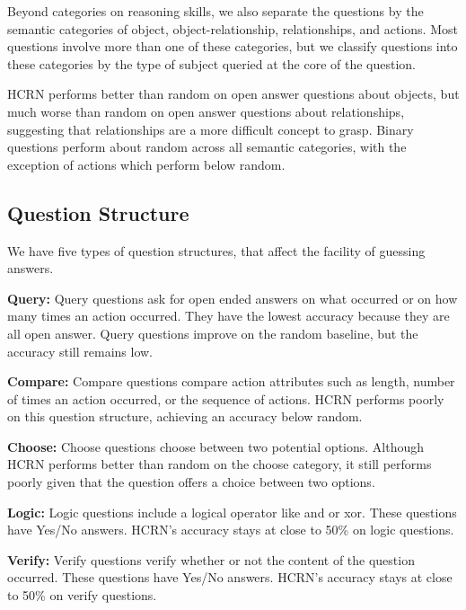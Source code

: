 \documentclass[10pt,twocolumn,letterpaper]{article}
\begin{document}
Beyond categories on reasoning skills, we also separate the questions by the semantic categories of object, object-relationship, relationships, and actions. Most questions involve more than one of these categories, but we classify questions into these categories by the type of subject queried at the core of the question. 

HCRN performs better than random on open answer questions about objects, but much worse than random on open answer questions about relationships, suggesting that relationships are a more difficult concept to grasp. Binary questions perform about random across all semantic categories, with the exception of actions which perform below random.


\subsection{Question Structure}

We have five types of question structures, that affect the facility of guessing answers. 

\textbf{Query: } Query questions ask for open ended answers on what occurred or on how many times an action occurred. They have the lowest accuracy because they are all open answer. Query questions improve on the random baseline, but the accuracy still remains low.

\textbf{Compare: } Compare questions compare action attributes such as length, number of times an action occurred, or the sequence of actions. HCRN performs poorly on this question structure, achieving an accuracy below random.

\textbf{Choose: } Choose questions choose between two potential options. Although HCRN performs better than random on the choose category, it still performs poorly given that the question offers a choice between two options.

\textbf{Logic: } Logic questions include a logical operator like and or xor. These questions have Yes/No answers. HCRN's accuracy stays at close to 50\% on logic questions.

\textbf{Verify: } Verify questions verify whether or not the content of the question occurred. These questions have Yes/No answers. HCRN's accuracy stays at close to 50\% on verify questions.
\end{document}
